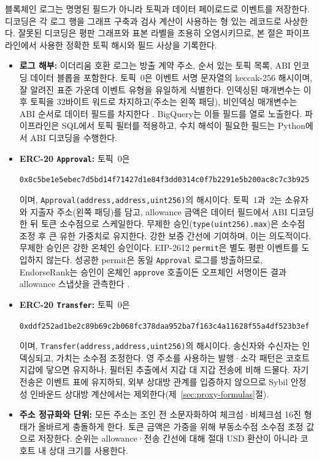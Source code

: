 
블록체인 로그는 명명된 필드가 아니라 토픽과 데이터 페이로드로 이벤트를 저장한다. 디코딩은 각 로그 행을 그래프 구축과 검사 계산이 사용하는 형 있는 레코드로 사상한다. 잘못된 디코딩은 평판 그래프와 표본 라벨을 조용히 오염시키므로, 본 절은 파이프라인에서 사용한 정확한 토픽 해시와 필드 사상을 기록한다.

\begin{itemize}
\item \textbf{로그 해부:} 이더리움 호환 로그는 방출 계약 주소, 순서 있는 토픽 목록, ABI 인코딩 데이터 블롭을 포함한다. 토픽~$0$은 이벤트 서명 문자열의 keccak-256 해시이며, 잘 알려진 표준 가운데 이벤트 유형을 유일하게 식별한다. 인덱싱된 매개변수는 이후 토픽을 $32$바이트 워드로 차지하고(주소는 왼쪽 패딩), 비인덱싱 매개변수는 ABI 순서로 데이터 필드를 차지한다 . BigQuery는 이들 필드를 열로 노출한다. 파이프라인은 SQL에서 토픽 필터를 적용하고, 수치 해석이 필요한 필드는 Python에서 ABI 디코딩을 수행한다.

\item \textbf{ERC-20 \texttt{Approval}:} 토픽~$0$은
\begin{center}
\texttt{0x8c5be1e5ebec7d5bd14f71427d1e84f3dd0314c0f7b2291e5b200ac8c7c3b925}
\end{center}
이며, \texttt{Approval(address,address,uint256)}의 해시이다. 토픽~$1$과~$2$는 소유자와 지출자 주소(왼쪽 패딩)를 담고, allowance 금액은 데이터 필드에서 ABI 디코딩한 뒤 토큰 소수점으로 스케일한다. 무제한 승인(\texttt{type(uint256).max})은 소수점 조정 후 큰 유한 가중치로 유지한다. 강한 보증 간선에 기여하며, 이는 의도적이다. 무제한 승인은 강한 온체인 승인이다. EIP-2612 \texttt{permit}은 별도 평판 이벤트를 도입하지 않는다. 성공한 permit은 동일 \texttt{Approval} 로그를 방출하므로, EndorseRank는 승인이 온체인 \texttt{approve} 호출이든 오프체인 서명이든 결과 allowance 스냅샷을 관측한다 .

\item \textbf{ERC-20 \texttt{Transfer}:} 토픽~$0$은
\begin{center}
\texttt{0xddf252ad1be2c89b69c2b068fc378daa952ba7f163c4a11628f55a4df523b3ef}
\end{center}
이며, \texttt{Transfer(address,address,uint256)}의 해시이다. 송신자와 수신자는 인덱싱되고, 가치는 소수점 조정한다. 영 주소를 사용하는 발행·소각 패턴은 코호트 지갑에 닿으면 유지하나, 필터된 추출에서 지갑 대 지갑 전송에 비해 드물다. 자기 전송은 이벤트 표에 유지하되, 외부 상대방 관계를 입증하지 않으므로 Sybil 안정성 인바운드 상대방 계산에서는 제외한다(제~\ref{sec:proxy-formulas}절).

\item \textbf{주소 정규화와 단위:} 모든 주소는 조인 전 소문자화하여 체크섬·비체크섬 16진 형태가 올바르게 충돌하게 한다. 토큰 금액은 가중을 위해 부동소수점 소수점 조정 값으로 저장한다. 순위는 allowance·전송 간선에 대해 절대 USD 환산이 아니라 코호트 내 상대 크기를 사용한다.

\end{itemize}

